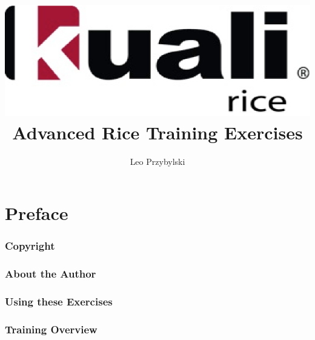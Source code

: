 \documentclass[letterpaper,notitlepage,12pt]{book}
\author{Leo Przybylski}
\title{\includegraphics[width=\textwidth]{cover.eps}\\Advanced Rice Training Exercises}
\date{}
\begin{document}
\maketitle
\tableofcontents
\part*{Preface}
\section{Copyright}
\section{About the Author}
\section{Using these Exercises}
\section{Training Overview}







\end{document}
